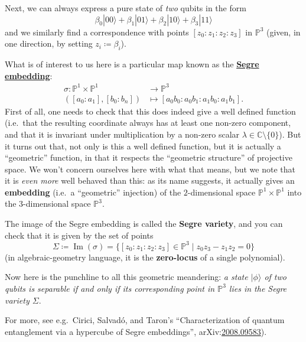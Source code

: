 \documentclass[fleqn]{article}
\newenvironment{technical}{\noindent}{\medskip}
\begin{document}
\begin{technical}
Next, we can always express a pure state of \emph{two} qubits in the form
\[
  \beta_0|00\rangle + \beta_1|01\rangle + \beta_2|10\rangle + \beta_3|11\rangle
\]
and we similarly find a correspondence with points \([z_0:z_1:z_2:z_3]\) in \(\mathbb{P}^3\) (given, in one direction, by setting \(z_i\coloneqq\beta_i\)).

What is of interest to us here is a particular map known as the \href{https://en.wikipedia.org/wiki/Segre_embedding}{\textbf{Segre embedding}}:
\[
  \begin{aligned}
    \sigma\colon\mathbb{P}^1\times\mathbb{P}^1
    &\longrightarrow\mathbb{P}^3
  \\([a_0:a_1],[b_0:b_n])
    &\longmapsto
    [a_0b_0:a_0b_1:a_1b_0:a_1b_1].
  \end{aligned}
\]
First of all, one needs to check that this does indeed give a well defined function (i.e.~that the resulting coordinate always has at least one non-zero component, and that it is invariant under multiplication by a non-zero scalar \(\lambda\in\mathbb{C}\setminus\{0\}\)).
But it turns out that, not only is this a well defined function, but it is actually a ``geometric'' function, in that it respects the ``geometric structure'' of projective space.
We won't concern ourselves here with what that means, but we note that it is \emph{even more} well behaved than this: as its name suggests, it actually gives an \textbf{embedding} (i.e.~a ``geometric'' injection) of the \(2\)-dimensional space \(\mathbb{P}^1\times\mathbb{P}^1\) into the \(3\)-dimensional space \(\mathbb{P}^3\).

The image of the Segre embedding is called the \textbf{Segre variety}, and you can check that it is given by the set of points
\[
  \Sigma
  \coloneqq \operatorname{Im}(\sigma)
  = \big\{ [z_0:z_1:z_2:z_3]\in\mathbb{P}^3 \mid z_0z_3-z_1z_2=0 \big\}
\]
(in algebraic-geometry language, it is the \textbf{zero-locus} of a single polynomial).

Now here is the punchline to all this geometric meandering: \emph{a state \(|\phi\rangle\) of two qubits is separable if and only if its corresponding point in \(\mathbb{P}^3\) lies in the Segre variety \(\Sigma\)}.

For more, see e.g.~Cirici, Salvadó, and Taron's ``Characterization of quantum entanglement via a hypercube of Segre embeddings'', arXiv:\href{https://arxiv.org/abs/2008.09583}{2008.09583}).

\end{technical}
\end{document}
